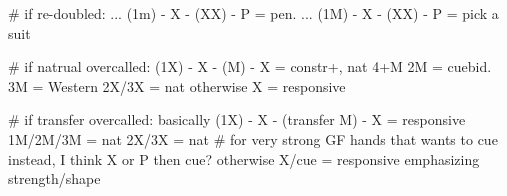 # if re-doubled:
... (1m) - X - (XX) - P = pen.
... (1M) - X - (XX) - P = pick a suit

# if natrual overcalled:
(1X) - X - (M) - 
    X = constr+, nat 4+M
    2M = cuebid. 3M = Western
    2X/3X = nat
otherwise X = responsive

# if transfer overcalled: basically
(1X) - X - (transfer M) - 
    X = responsive
    1M/2M/3M = nat
    2X/3X = nat
    # for very strong GF hands that wants to cue instead, I think X or P then cue?
otherwise X/cue = responsive emphasizing strength/shape